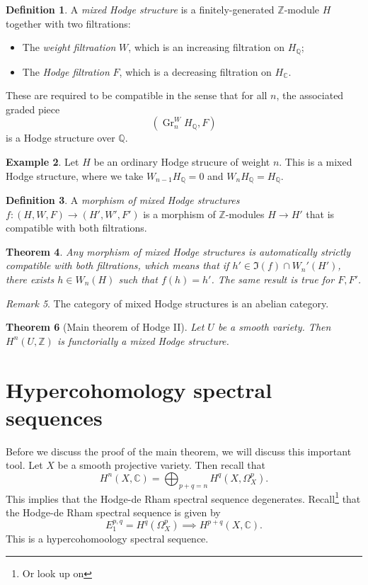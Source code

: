 \documentclass[leqno, openany]{memoir}
\newtheorem{thm}{Theorem}[section]
\theoremstyle{definition}
\newtheorem{defn}[thm]{Definition}
\newtheorem{exm}[thm]{Example}
\theoremstyle{remark}
\newtheorem{rmk}[thm]{Remark}
\theoremstyle{plain}
\theoremstyle{definition}
\theoremstyle{remark}
\newcommand{\C}{\mathbb{C}}
\newcommand{\Z}{\mathbb{Z}}
\newcommand{\Q}{\mathbb{Q}}
\newcommand{\on}[1]{\operatorname{#1}}
\begin{document}
\begin{defn}
    A \textit{mixed Hodge structure} is a finitely-generated $\Z$-module $H$ together with two filtrations:
    \begin{itemize}
        \item The \textit{weight filtraation} $W$, which is an increasing filtration on $H_{\Q}$;
        \item The \textit{Hodge filtration} $F$, which is a decreasing filtration on $H_{\C}$.
    \end{itemize}
    These are required to be compatible in the sense that for all $n$, the associated graded piece
    \[ (\on{Gr}_n^W H_{\Q}, F) \]
    is a Hodge structure over $\Q$.
\end{defn}

\begin{exm}
    Let $H$ be an ordinary Hodge strucure of weight $n$. This is a mixed Hodge structure, where we take $W_{n-1} H_{\Q} = 0$ and $W_n H_{\Q} = H_{\Q}$.
\end{exm}

\begin{defn}
    A \textit{morphism of mixed Hodge structures} $f \colon (H,W,F) \to (H',W',F')$ is a morphism of $\Z$-modules $H \to H'$ that is compatible with both filtrations.
\end{defn}

\begin{thm}
    Any morphism of mixed Hodge structures is automatically \textit{strictly compatible with both filtrations}, which means that if $h' \in \Im(f) \cap W_n'(H')$, there exists $h \in W_n(H)$ such that $f(h) = h'$. The same result is true for $F, F'$.
\end{thm}

\begin{rmk}
    The category of mixed Hodge structures is an abelian category.
\end{rmk}

\begin{thm}[Main theorem of Hodge II]\label{thm:mhs}
    Let $U$ be a smooth variety. Then $H^n(U, \Z)$ is functorially a mixed Hodge structure.
\end{thm}

\section{Hypercohomology spectral sequences}%
\label{sec:hypercohomology_spectral_sequences}

Before we discuss the proof of the main theorem, we will discuss this important tool. Let $X$ be a smooth projective variety. Then recall that 
\[ H^n(X, \C) = \bigoplus_{p+q=n} H^{q}(X,\Omega^p_X). \]
This implies that the Hodge-de Rham spectral sequence degenerates. Recall\footnote{Or look up on } that the Hodge-de Rham spectral sequence is given by
\[ E_1^{p,q} = H^q(\Omega_X^p) \implies H^{p+q}(X, \C). \]
This is a hypercohomoology spectral sequence.
\end{document}
